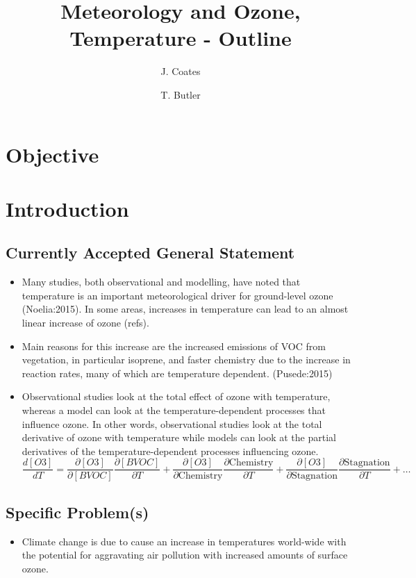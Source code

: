 \documentclass[11pt,a4paper]{article}
\title{Meteorology and Ozone, Temperature - Outline}
\author[1]{J. Coates}
\author[1]{T. Butler}
\affil[1]{Institute for Advanced Sustainability Studies, Potsdam, Germany}
\begin{document}
\maketitle

\section{Objective}


\section{Introduction} \label{s:introduction}
\subsection{Currently Accepted General Statement}
\begin{itemize}
    \item Many studies, both observational and modelling, have noted that temperature is an important meteorological driver for ground-level ozone (Noelia:2015). In some areas, increases in temperature can lead to an almost linear increase of ozone (refs).
    \item Main reasons for this increase are the increased emissions of VOC from vegetation, in particular isoprene, and faster chemistry due to the increase in reaction rates, many of which are temperature dependent. (Pusede:2015)
    \item Observational studies look at the total effect of ozone with temperature, whereas a model can look at the temperature-dependent processes that influence ozone. In other words, observational studies look at the total derivative of ozone with temperature while models can look at the partial derivatives of the temperature-dependent processes influencing ozone. 
        \begin{equation*} 
            \frac{d[O3]}{dT} = \frac{\partial [O3]}{\partial [BVOC]}\frac{\partial [BVOC]}{\partial T} + \frac{\partial [O3]}{\partial \text{Chemistry}}\frac{\partial \text{Chemistry}}{\partial T} + \frac{\partial [O3]}{\partial \text{Stagnation}}\frac{\partial \text{Stagnation}}{\partial T} + \dots
        \end{equation*}
\end{itemize}

\subsection{Specific Problem(s)}
\begin{itemize}
    \item Climate change is due to cause an increase in temperatures world-wide with the potential for aggravating air pollution with increased amounts of surface ozone.
\end{itemize}
\end{document}
